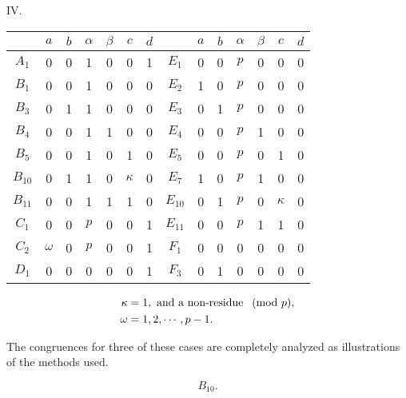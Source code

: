 \documentclass[oneside]{article}
\begin{document}
\begin{center}
\large IV. \normalsize

\smallskip
\begin{tabular}{|c|c|c|c|c|c|c||c|c|c|c|c|c|c|}
\hline
        &   $a$  &$b$&$\alpha$&$\beta$&   $c$  &$d$&        &$a$&$b$&$\alpha$&$\beta$&   $c$  &$d$ \\ \hline
$A_1$   &    0   & 0 &    1   &   0   &    0   & 1 &$E_1$   & 0 & 0 &   $p$  &   0   &    0   & 0  \\ \hline
$B_1$   &    0   & 0 &    1   &   0   &    0   & 0 &$E_2$   & 1 & 0 &   $p$  &   0   &    0   & 0  \\ \hline
$B_3$   &    0   & 1 &    1   &   0   &    0   & 0 &$E_3$   & 0 & 1 &   $p$  &   0   &    0   & 0  \\ \hline
$B_4$   &    0   & 0 &    1   &   1   &    0   & 0 &$E_4$   & 0 & 0 &   $p$  &   1   &    0   & 0  \\ \hline
$B_5$   &    0   & 0 &    1   &   0   &    1   & 0 &$E_5$   & 0 & 0 &   $p$  &   0   &    1   & 0  \\ \hline
$B_{10}$&    0   & 1 &    1   &   0   &$\kappa$& 0 &$E_7$   & 1 & 0 &   $p$  &   1   &    0   & 0  \\ \hline
$B_{11}$&    0   & 0 &    1   &   1   &    1   & 0 &$E_{10}$& 0 & 1 &   $p$  &   0   &$\kappa$& 0  \\ \hline
$C_1$   &    0   & 0 &   $p$  &   0   &    0   & 1 &$E_{11}$& 0 & 0 &   $p$  &   1   &    1   & 0  \\ \hline
$C_2$   &$\omega$& 0 &   $p$  &   0   &    0   & 1 &$F_1$   & 0 & 0 &   0    &   0   &    0   & 0  \\ \hline
$D_1$   &    0   & 0 &    0   &   0   &    0   & 1 &$F_3$   & 0 & 1 &   0    &   0   &    0   & 0  \\ \hline
\end{tabular}

\footnotesize
\begin{align*}
\kappa &= 1, \hbox{ and a non-residue } \pmod{p}, \\
\omega &= 1, 2, \cdots, p - 1.
\end{align*}
\normalsize
\end{center}

\medskip
The congruences for three of these cases are completely analyzed as
illustrations of the methods used.

\medskip
\begin{equation*} B_{10}. \end{equation*}
\end{document}
